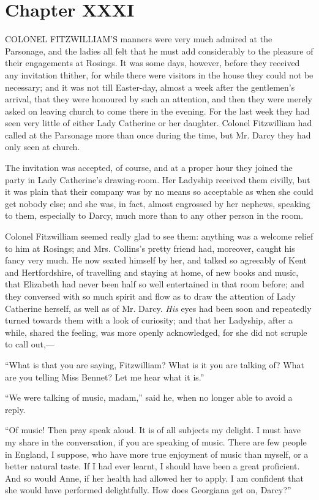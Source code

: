 \documentclass[12pt,openright]{book}
\begin{document}
\chapter{Chapter XXXI}

\noindent  COLONEL FITZWILLIAM’S manners were very much admired at the Parsonage, and the ladies all felt that he must add considerably to the pleasure of their engagements at Rosings. It was some days, however, before they received any invitation thither, for while there were visitors in the house they could not be necessary; and it was not till Easter-day, almost a week after the gentlemen’s arrival, that they were honoured by such an attention, and then they were merely asked on leaving church to come there in the evening. For the last week they had seen very little of either Lady Catherine or her daughter. Colonel Fitzwilliam had called at the Parsonage more than once during the time, but Mr. Darcy they had only seen at church.

The invitation was accepted, of course, and at a proper hour they joined the party in Lady Catherine’s drawing-room. Her Ladyship received them civilly, but it was plain that their company was by no means so acceptable as when she could get nobody else; and she was, in fact, almost engrossed by her nephews, speaking to them, especially to Darcy, much more than to any other person in the room.

Colonel Fitzwilliam seemed really glad to see them: anything was a welcome relief to him at Rosings; and Mrs. Collins’s pretty friend had, moreover, caught his fancy very much. He now seated himself by her, and talked so agreeably of Kent and Hertfordshire, of travelling and staying at home, of new books and music, that Elizabeth had never been half so well entertained in that room before; and they conversed with so much spirit and flow as to draw the attention of Lady Catherine herself, as well as of Mr. Darcy. \textit{His} eyes had been soon and repeatedly turned towards them with a look of curiosity; and that her Ladyship, after a while, shared the feeling, was more openly acknowledged, for she did not scruple to call out,—

“What is that you are saying, Fitzwilliam? What is it you are talking of? What are you telling Miss Bennet? Let me hear what it is.”

“We were talking of music, madam,” said he, when no longer able to avoid a reply.

“Of music! Then pray speak aloud. It is of all subjects my delight. I must have my share in the conversation, if you are speaking of music. There are few people in England, I suppose, who have more true enjoyment of music than myself, or a better natural taste. If I had ever learnt, I should have been a great proficient. And so would Anne, if her health had allowed her to apply. I am confident that she would have performed delightfully. How does Georgiana get on, Darcy?”
\end{document}
